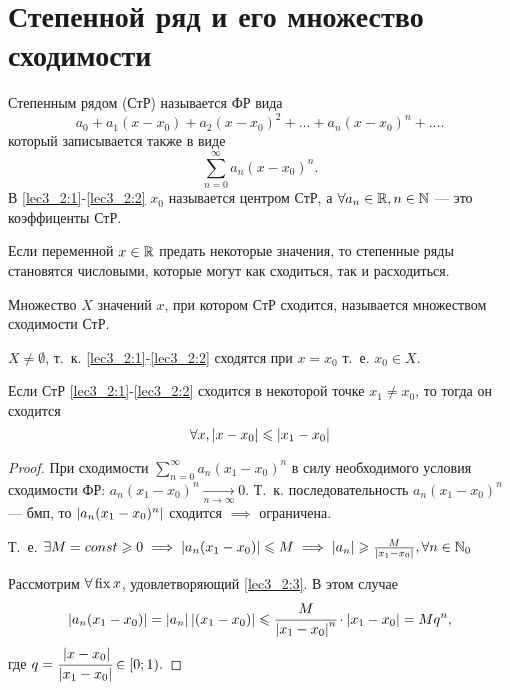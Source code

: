 \documentclass[../../main.tex]{subfiles}
\begin{document}
\section{Степенной ряд и его множество сходимости}

Степенным рядом (СтР) называется ФР вида
\begin{equation}\label{lec3_2:1}
a_0+a_1(x-x_0)+a_2(x-x_0)^2+\dots+a_n(x-x_0)^n+\dots.
\end{equation}
который записывается также в виде
\begin{equation}\label{lec3_2:2}
\sum_{n=0}^{\infty}a_n(x-x_0)^n.
\end{equation}
В \ref{lec3_2:1}-\ref{lec3_2:2} $x_0$ называется центром СтР, 
а $\forall a_n \in \mathbb{R}, n\in \mathbb{N}$ --- это коэффиценты СтР.

Если переменной $x\in\mathbb{R}$ предать некоторые значения, 
то степенные ряды становятся числовыми, которые могут как сходиться, 
так и расходиться.

Множество $X$ значений $x$, при котором СтР сходится, 
называется множеством сходимости СтР. 

$X \neq \emptyset$, т.~к. \ref{lec3_2:1}-\ref{lec3_2:2} 
сходятся при $x=x_0$ т.~е. $x_0\in X$.

\begin{lem}
	Если СтР \ref{lec3_2:1}-\ref{lec3_2:2} сходится в некоторой 
	точке $x_1\neq x_0$, то тогда он сходится 
	\begin{equation}\label{lec3_2:3}
		\forall x, \left|{ x - x_0}\right| \leqslant \left|{x_1 - x_0}\right|
	\end{equation}
\end{lem}
\begin{proof}
	При сходимости $\sum_{n=0}^{\infty}a_n(x_1-x_0)^n$ в силу необходимого
	 условия сходимости ФР: $a_n(x_1-x_0)^n\underset{n\to\infty}{\rightarrow}0$. 
	Т.~к. последовательность $a_n(x_1-x_0)^n$ --- бмп, 
	то $\left|{a_n(x_1-x_0)^n}\right|$ сходится $\implies$ ограничена.
	
	Т.~е. $\exists M=const \geqslant0 \implies \left|{a_n(x_1-x_0)}\right| \leqslant M
	\implies \left|{a_n}\right|\geqslant \frac{M}{\left|{x_1-x_0}\right|}, \forall n\in\mathbb{N}_0$
	
	Рассмотрим $\forall \operatorname{fix} x $, удовлетворяющий \ref{lec3_2:3}. 
	В этом случае  
	\begin{equation*}
		\left|{a_n(x_1-x_0)}\right| = \left|{a_n}\right|\left|{(x_1-x_0)}\right|\leqslant 
		\cfrac{M}{\left|{x_1-x_0}\right|^n}\cdot \left|{x_1-x_0}\right|=Mq^n,
	\end{equation*}
	где $q=\cfrac{\left|{x-x_0}\right|}{\left|{x_1-x_0}\right|}\in{\left[0;1\right)}.$
\end{proof}	
\end{document}
